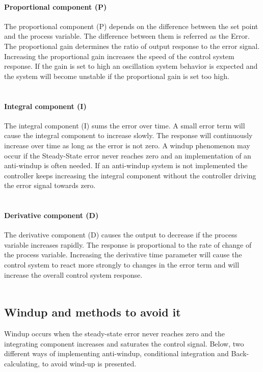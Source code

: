 \paragraph{Proportional component (P)} 
The proportional component (P) depends on the difference between the set point and the process variable. The difference between them is referred as the Error. The proportional gain determines the ratio of output response to the error signal. Increasing the proportional gain increases the speed of the control system response. If the gain is set to high an oscillation system behavior is expected and the system will become unstable if the proportional gain is set too high. 
\\
\\
\paragraph{Integral component (I)}
The integral component (I) sums the error over time. A small error term will cause the integral component to increase slowly. The response will continuously increase over time as long as the error is not zero. A windup phenomenon may occur if the Steady-State error never reaches zero and an implementation of an anti-windup is often needed. If an anti-windup system is not implemented the controller keeps increasing the integral component without the controller driving the error signal towards zero. 
\\
\\
\paragraph{Derivative component (D)}
The derivative component (D) causes the output to decrease if the process variable increases rapidly. The response is proportional to the rate of change of the process variable. Increasing the derivative time parameter will cause the control system to react more strongly to changes in the error term and will increase the overall control system response. \cite{PID}
\\
\\
\subsection{Windup and methods to avoid it}
Windup occurs when the steady-state error never reaches zero and the integrating component increases and saturates the control signal. Below, two different ways of implementing anti-windup, conditional integration and Back-calculating, to avoid wind-up is presented.\\
\\
